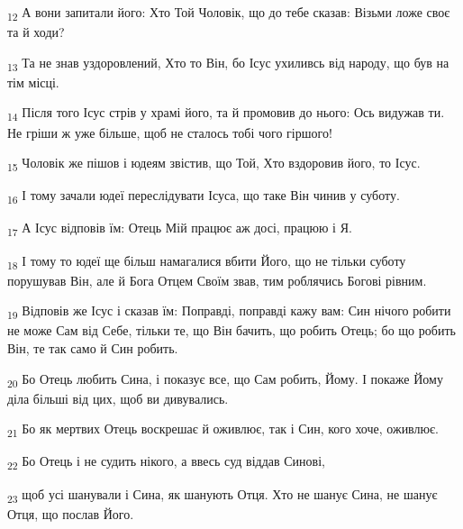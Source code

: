 \begin{tcolorbox}
\textsubscript{12} А вони запитали його: Хто Той Чоловік, що до тебе сказав: Візьми ложе своє та й ходи?
\end{tcolorbox}
\begin{tcolorbox}
\textsubscript{13} Та не знав уздоровлений, Хто то Він, бо Ісус ухиливсь від народу, що був на тім місці.
\end{tcolorbox}
\begin{tcolorbox}
\textsubscript{14} Після того Ісус стрів у храмі його, та й промовив до нього: Ось видужав ти. Не гріши ж уже більше, щоб не сталось тобі чого гіршого!
\end{tcolorbox}
\begin{tcolorbox}
\textsubscript{15} Чоловік же пішов і юдеям звістив, що Той, Хто вздоровив його, то Ісус.
\end{tcolorbox}
\begin{tcolorbox}
\textsubscript{16} І тому зачали юдеї переслідувати Ісуса, що таке Він чинив у суботу.
\end{tcolorbox}
\begin{tcolorbox}
\textsubscript{17} А Ісус відповів їм: Отець Мій працює аж досі, працюю і Я.
\end{tcolorbox}
\begin{tcolorbox}
\textsubscript{18} І тому то юдеї ще більш намагалися вбити Його, що не тільки суботу порушував Він, але й Бога Отцем Своїм звав, тим роблячись Богові рівним.
\end{tcolorbox}
\begin{tcolorbox}
\textsubscript{19} Відповів же Ісус і сказав їм: Поправді, поправді кажу вам: Син нічого робити не може Сам від Себе, тільки те, що Він бачить, що робить Отець; бо що робить Він, те так само й Син робить.
\end{tcolorbox}
\begin{tcolorbox}
\textsubscript{20} Бо Отець любить Сина, і показує все, що Сам робить, Йому. І покаже Йому діла більші від цих, щоб ви дивувались.
\end{tcolorbox}
\begin{tcolorbox}
\textsubscript{21} Бо як мертвих Отець воскрешає й оживлює, так і Син, кого хоче, оживлює.
\end{tcolorbox}
\begin{tcolorbox}
\textsubscript{22} Бо Отець і не судить нікого, а ввесь суд віддав Синові,
\end{tcolorbox}
\begin{tcolorbox}
\textsubscript{23} щоб усі шанували і Сина, як шанують Отця. Хто не шанує Сина, не шанує Отця, що послав Його.
\end{tcolorbox}
